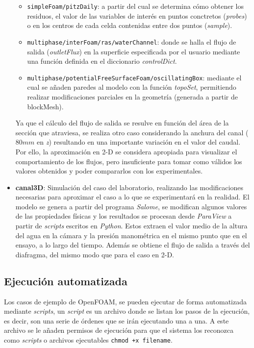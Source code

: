 \begin{itemize}
  \begin{itemize}
  \item
    \lstinline[style=bash]{simpleFoam/pitzDaily}: a partir del cual se determina cómo
    obtener los residuos, el valor de las variables de interés en puntos
    conctretos (\emph{probes}) o en los centros de cada celda contenidas
    entre dos puntos (\emph{sample}).
  \item
    \lstinline[style=bash]{multiphase/interFoam/ras/waterChannel}: donde se halla el
    flujo de salida (\emph{outletFlux}) en la superficie especificada
    por el usuario mediante una función definida en el diccionario
    \emph{controlDict}.
  \item
    \lstinline[style=bash]{multiphase/potentialFreeSurfaceFoam/oscillatingBox}:
    mediante el cual se añaden paredes al modelo con la función
    \emph{topoSet}, permitiendo realizar modificaciones parciales en la
    geometría (generada a partir de blockMesh).
  \end{itemize}

  Ya que el cálculo del flujo de salida se resulve en función del área
  de la sección que atraviesa, se realiza otro caso considerando la
  anchura del canal (\(80 mm\) en \emph{z}) resultando en una importante
  variación en el valor del caudal. Por ello, la aproximación en 2-D se
  considera apropiada para visualizar el comportamiento de los flujos,
  pero insuficiente para tomar como válidos los valores obtenidos y
  poder compararlos con los experimentales.
\item
  \textbf{canal3D}: Simulación del caso del laboratorio, realizando las
  modificaciones necesarias para aproximar el caso a lo que se
  experimentará en la realidad. El modelo se genera a partir del
  programa \emph{Salome}, se modifican algunos valores de las
  propiedades físicas y los resultados se procesan desde \emph{ParaView}
  a partir de \emph{scripts} escritos en \emph{Python}. Estos extraen el
  valor medio de la altura del agua en la cámara y la presión
  manométrica en el mismo punto que en el ensayo, a lo largo del tiempo.
  Además se obtiene el flujo de salida a través del diafragma, del mismo
  modo que para el caso en 2-D.
\end{itemize}

\subsection{Ejecución automatizada}\label{header-n52}

Los casos de ejemplo de OpenFOAM, se pueden ejecutar de forma
automatizada mediante \emph{scripts}, un \emph{script} es un archivo
donde se listan los pasos de la ejecución, es decir, son una serie de
órdenes que se irán ejecutando una a una. A este archivo se le añaden
permisos de ejecución para que el sistema los reconozca como
\emph{scripts} o archivos ejecutables \lstinline[style=bash]{chmod +x filename}.

